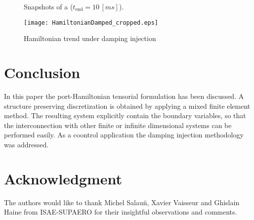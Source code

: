 \documentclass[letterpaper, 10 pt, conference]{ieeeconf}
\begin{document}
\begin{figure}[t]
	\centering
	\hfil
	\caption{Snapshots of a  ($t_{\text{end}} = 10 \,[ms]$).}
	\label{fig:SnapDamp}
	\hfil
\end{figure}

\begin{figure}[t]
\centering
\texttt{[image: HamiltonianDamped\_cropped.eps]}
\caption{Hamiltonian trend under damping injection}
\label{fig:H_Damped}
\end{figure}

\section{Conclusion}
In this paper the port-Hamiltonian tensorial formulation has been discussed. A structure preserving discretization is obtained by applying a mixed finite element method. The resulting system explicitly contain the boundary variables, so that the interconnection with other finite or infinite dimensional systems can be performed easily. As a coontrol application the damping injection methodology was addressed.








\section*{Acknowledgment}


The authors would like to thank Michel Salau\"n, Xavier Vaisseur and Ghislain Haine from ISAE-SUPAERO for their insightful observations and comments.
\end{document}
